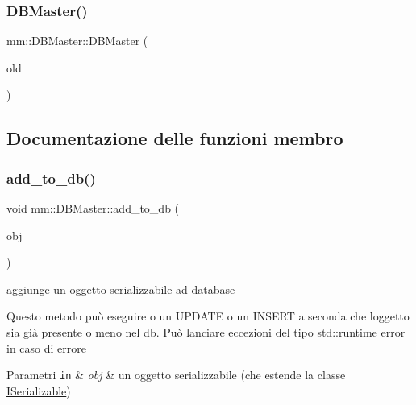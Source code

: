 \subsubsection{\texorpdfstring{D\+B\+Master()}{DBMaster()}}
{\footnotesize\ttfamily mm\+::\+D\+B\+Master\+::\+D\+B\+Master (\begin{DoxyParamCaption}\item[{const \hyperlink{classmm_1_1_d_b_master}{D\+B\+Master} \&}]{old }\end{DoxyParamCaption})\hspace{0.3cm}{\ttfamily [delete]}}



\subsection{Documentazione delle funzioni membro}
\mbox{\label{classmm_1_1_d_b_master_a187988c8741d0a2c5806919b8d672af0}} 
\subsubsection{\texorpdfstring{add\+\_\+to\+\_\+db()}{add\_to\_db()}}
{\footnotesize\ttfamily void mm\+::\+D\+B\+Master\+::add\+\_\+to\+\_\+db (\begin{DoxyParamCaption}\item[{const \hyperlink{classmm_1_1_i_serializable}{I\+Serializable} \&}]{obj }\end{DoxyParamCaption})}



aggiunge un oggetto serializzabile ad database 

Questo metodo può eseguire o un U\+P\+D\+A\+TE o un I\+N\+S\+E\+RT a seconda che l\textquotesingle{}oggetto sia già presente o meno nel db. Può lanciare eccezioni del tipo std\+::runtime error in caso di errore


\begin{DoxyParams}[1]{Parametri}
\mbox{\tt in}  & {\em obj} & un oggetto serializzabile (che estende la classe \hyperlink{classmm_1_1_i_serializable}{I\+Serializable}) \\
\hline
\end{DoxyParams}
\mbox{\label{classmm_1_1_d_b_master_a9e8092b67a249a273668ad042a4084e2}} 
